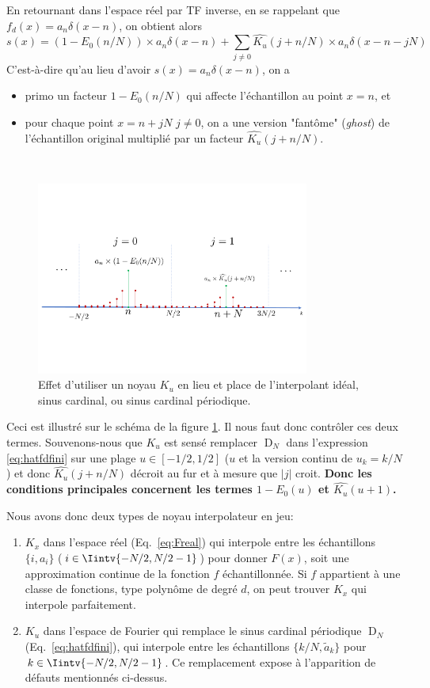 \documentclass[11pt,twoside]{article}
\newcommand{\itemb}{\item[$\bullet$]}
\DeclareMathOperator{\D}{D}
\begin{document}
En retournant dans l'espace réel par TF inverse, en se rappelant que $f_d(x)=a_n\delta(x-n)$, on obtient alors
\begin{equation}
s(x) = (1-E_0(n/N))\times a_n\delta(x-n) + \sum_{j\neq 0} \widehat{K_u}(j+n/N)\times a_n \delta(x-n-jN)
\label{eq:ghosts}
\end{equation} 
C'est-à-dire qu'au lieu d'avoir $s(x)=a_n\delta(x-n)$, on a
\begin{itemize}
\itemb primo un facteur $1-E_0(n/N)$ qui affecte l'échantillon au point $x=n$, et
\itemb pour chaque point $x=n+jN$ $j\neq 0$, on a une version "fantôme" (\textit{ghost}) de l'échantillon original multiplié par un facteur $\widehat{K_u}(j+n/N)$.
\end{itemize} 
\hfill\\
\begin{figure}[h]
\centering
\includegraphics[width=0.8\textwidth]{fig2.pdf}
\caption{Effet d'utiliser un noyau $K_u$ en lieu et place de l'interpolant idéal, sinus cardinal, ou  sinus cardinal périodique.}
\label{fig-Ku-effet}
\end{figure}
Ceci est illustré sur le schéma de la figure \ref{fig-Ku-effet}. Il nous faut donc contrôler ces deux termes. Souvenons-nous que $K_u$ est sensé remplacer $\D_N$ dans l'expression \ref{eq:hatfdfini} sur une plage $u \in [-1/2,1/2]$ ($u$ et la version continu de $u_k=k/N$) et donc $\widehat{K_u}(j+n/N)$ décroit au fur et à mesure que $|j|$ croit. \textbf{Donc les conditions principales concernent les termes  $1-E_0(u)$ et $\widehat{K_u}(u+1)$.}

Nous avons donc deux types de noyau interpolateur en jeu: 
\begin{enumerate}
\item $K_x$ dans l'espace réel (Eq.~\ref{eq:Freal}) qui interpole entre les échantillons $\{i,a_i\}$ ($i\in \Iintv{-N/2,N/2-1}$) pour donner $F(x)$, soit une approximation continue de la fonction $f$ échantillonnée. Si $f$ appartient à une classe de fonctions, type polynôme de degré $d$, on peut trouver $K_x$ qui interpole parfaitement.
\item $K_u$ dans l'espace de Fourier qui remplace le sinus cardinal périodique $\D_N$ (Eq.~\ref{eq:hatfdfini}), qui interpole entre les échantillons $\{k/N, \tilde{a}_k\}$ pour $k\in\Iintv{-N/2,N/2-1}$. Ce remplacement expose à l'apparition de défauts mentionnés ci-dessus.
\end{enumerate}
\end{document}
